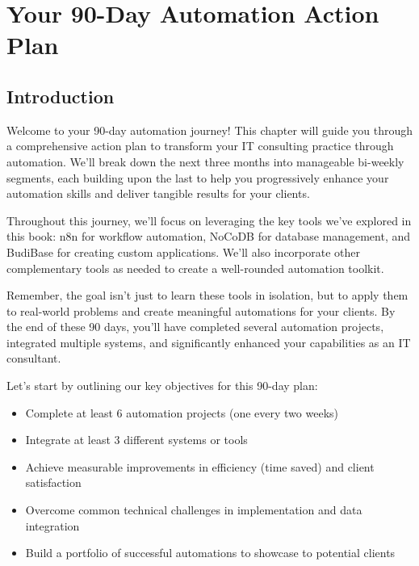 \chapter{Your 90-Day Automation Action Plan}


\section{Introduction}

Welcome to your 90-day automation journey! This chapter will guide you through a comprehensive action plan to transform your IT consulting practice through automation. We'll break down the next three months into manageable bi-weekly segments, each building upon the last to help you progressively enhance your automation skills and deliver tangible results for your clients.

Throughout this journey, we'll focus on leveraging the key tools we've explored in this book: n8n for workflow automation, NoCoDB for database management, and BudiBase for creating custom applications. We'll also incorporate other complementary tools as needed to create a well-rounded automation toolkit.

Remember, the goal isn't just to learn these tools in isolation, but to apply them to real-world problems and create meaningful automations for your clients. By the end of these 90 days, you'll have completed several automation projects, integrated multiple systems, and significantly enhanced your capabilities as an IT consultant.

Let's start by outlining our key objectives for this 90-day plan:

\begin{itemize}
    \item Complete at least 6 automation projects (one every two weeks)
    \item Integrate at least 3 different systems or tools
    \item Achieve measurable improvements in efficiency (time saved) and client satisfaction
    \item Overcome common technical challenges in implementation and data integration
    \item Build a portfolio of successful automations to showcase to potential clients
\end{itemize}

